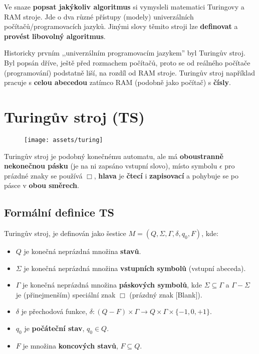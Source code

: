 Ve snaze \textbf{popsat jakýkoliv algoritmus} si vymysleli matematici Turingovy a RAM stroje. Jde o dva různé přístupy (modely) univerzálních počítačů/programovacích jazyků. Jinými slovy těmito stroji lze \textbf{definovat} a \textbf{provést} \textbf{libovolný algoritmus}.

Historicky prvním ,,univerzálním programovacím jazykem'' byl Turingův stroj. Byl popsán dříve, ještě před rozmachem počítačů, proto se od reálného počítače (programování) podstatně liší, na rozdíl od RAM stroje. Turingův stroj například pracuje s \textbf{celou abecedou} zatímco RAM (podobně jako počítač) s \textbf{čísly}.

\section{Turingův stroj (TS)}
\begin{figure}[H]
    \centering
    \texttt{[image: assets/turing]}
\end{figure}
Turingův stroj je podobný konečnému automatu, ale má \textbf{oboustranně nekonečnou pásku} (je na ni zapsáno vstupní slovo), místo symbolu $\epsilon$ pro prázdné znaky se používá $\Box$, \textbf{hlava} je \textbf{čtecí} i \textbf{zapisovací} a pohybuje se po pásce v \textbf{obou směrech}.

\subsection{Formální definice TS}
Turingův stroj, je definován jako šestice $M = (Q, \Sigma, \Gamma, \delta, q_0, F)$, kde:
\begin{itemize}
    \item $Q$ je konečná neprázdná množina \textbf{stavů}.
    \item $\Sigma$ je konečná neprázdná množina \textbf{vstupních symbolů} (vstupní abeceda).
    \item $\Gamma$ je konečná neprázdná množina \textbf{páskových symbolů}, kde $\Sigma \subseteq \Gamma$ a $\Gamma - \Sigma$ je (přinejmenším) speciální znak $\Box$ (prázdný znak [Blank]).
    \item $\delta$ je přechodová funkce, $\delta: (Q - F) \times \Gamma \rightarrow Q \times \Gamma \times \{-1, 0, +1\}$.
    \item $q_0$ je \textbf{počáteční stav}, $q_0 \in Q$.
    \item $F$ je množina \textbf{koncových stavů}, $F \subseteq Q$.
\end{itemize}

